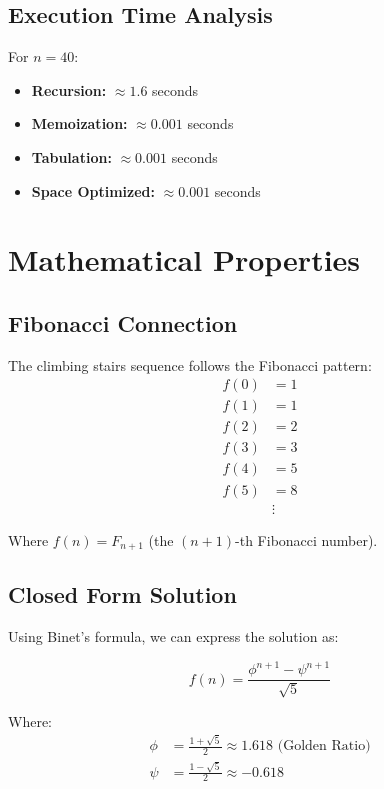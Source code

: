 \documentclass[12pt,a4paper]{article}
\begin{document}
\subsection{Execution Time Analysis}

For $n = 40$:
\begin{itemize}
\item \textbf{Recursion:} $\approx 1.6$ seconds
\item \textbf{Memoization:} $\approx 0.001$ seconds  
\item \textbf{Tabulation:} $\approx 0.001$ seconds
\item \textbf{Space Optimized:} $\approx 0.001$ seconds
\end{itemize}

\section{Mathematical Properties}

\subsection{Fibonacci Connection}
The climbing stairs sequence follows the Fibonacci pattern:
\begin{align}
f(0) &= 1 \\
f(1) &= 1 \\
f(2) &= 2 \\
f(3) &= 3 \\
f(4) &= 5 \\
f(5) &= 8 \\
&\vdots
\end{align}

Where $f(n) = F_{n+1}$ (the $(n+1)$-th Fibonacci number).

\subsection{Closed Form Solution}
Using Binet's formula, we can express the solution as:

\begin{equation}
f(n) = \frac{\phi^{n+1} - \psi^{n+1}}{\sqrt{5}}
\end{equation}

Where:
\begin{align}
\phi &= \frac{1 + \sqrt{5}}{2} \approx 1.618 \text{ (Golden Ratio)} \\
\psi &= \frac{1 - \sqrt{5}}{2} \approx -0.618
\end{align}
\end{document}
